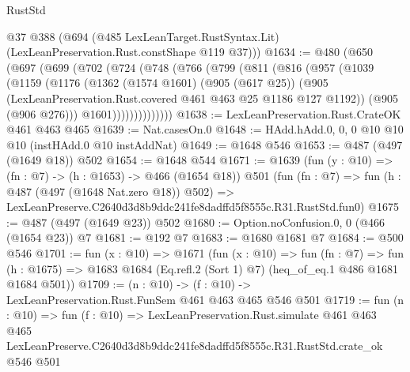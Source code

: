 \begin{lexlean}{RustStd}
\begin{coremodule}
      @37
      @388
      (@694 (@485 LexLeanTarget.RustSyntax.Lit) (LexLeanPreservation.Rust.constShape @119 @37)))
@1634 := @480
    (@650
      (@697
        (@699
          (@702
            (@724
              (@748
                (@766
                  (@799
                    (@811
                      (@816
                        (@957
                          (@1039
                            (@1159
                              (@1176
                                (@1362
                                  (@1574 @1601)
                                  (@905 (@617 @25))
                                  (@905
                                    (LexLeanPreservation.Rust.covered
                                      @461
                                      @463
                                      @25
                                      @1186
                                      @127
                                      @1192))
                                  (@905 (@906 @276)))
                                @1601))))))))))))))
@1638 := LexLeanPreservation.Rust.CrateOK @461 @463 @465
@1639 := Nat.casesOn.{0}
@1648 := HAdd.hAdd.{0, 0, 0} @10 @10 @10 (instHAdd.{0} @10 instAddNat)
@1649 := @1648 @546
@1653 := @487 (@497 (@1649 @18)) @502
@1654 := @1648 @544
@1671 := @1639
    (fun (y : @10) => (fn : @7) -> (h : @1653) -> @466 (@1654 @18))
    @501
    (fun (fn : @7) =>
    fun (h : @487 (@497 (@1648 Nat.zero @18)) @502) =>
    LexLeanPreserve.C2640d3d8b9ddc241fe8dadffd5f8555c.R31.RustStd.fun0)
@1675 := @487 (@497 (@1649 @23)) @502
@1680 := Option.noConfusion.{0, 0} (@466 (@1654 @23)) @7
@1681 := @192 @7
@1683 := @1680 @1681 @7
@1684 := @500 @546
@1701 := fun (x : @10) =>
  @1671
    (fun (x : @10) =>
    fun (fn : @7) =>
    fun (h : @1675) => @1683 @1684 (Eq.refl.{2} (Sort 1) @7) (heq_of_eq.{1} @486 @1681 @1684 @501))
@1709 := (n : @10) -> (f : @10) -> LexLeanPreservation.Rust.FunSem @461 @463 @465 @546 @501
@1719 := fun (n : @10) =>
  fun (f : @10) =>
  LexLeanPreservation.Rust.simulate
    @461
    @463
    @465
    LexLeanPreserve.C2640d3d8b9ddc241fe8dadffd5f8555c.R31.RustStd.crate_ok
    @546
    @501
\end{coremodule}
\end{lexlean}
